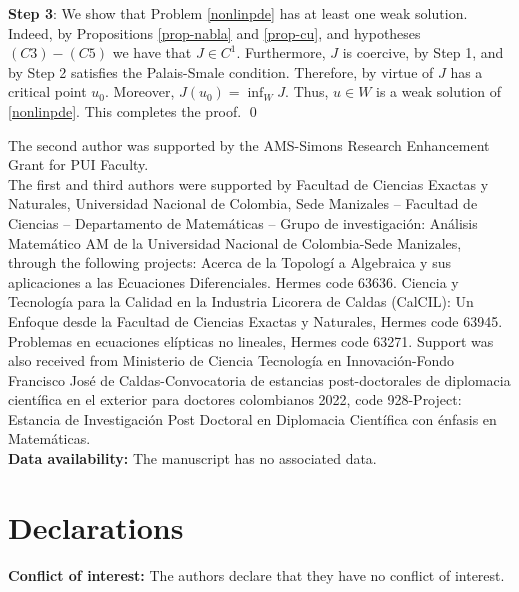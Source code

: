 \documentclass[pdflatex,sn-mathphys-num]{sn-jnl}
\theoremstyle{thmstyleone}%
\theoremstyle{thmstyletwo}%
\theoremstyle{thmstylethree}%
\theoremstyle{thmstylethree}%
\begin{document}
\vskip0.2cm
\noindent
\textbf{Step 3}: We show that Problem \eqref{nonlinpde} has at least one weak solution.
Indeed, by Propositions \ref{prop-nabla} and \ref{prop-cu}, and hypotheses $(C3)-(C5)$ we have that $J\in C^1$. Furthermore, $J$ is coercive, by Step 1, and by Step 2 satisfies the Palais-Smale condition. Therefore, by virtue of \cite[Theorem 2.7]{PR} $J$ has a critical point $u_0$. Moreover, $\displaystyle J(u_0)=\inf_W J$. Thus, $u\in W$  is a weak solution of \eqref{nonlinpde}. This completes the proof. \qed




 The second author  was  supported by the AMS-Simons Research Enhancement Grant for PUI Faculty.\\
 The first and third authors  were  supported by Facultad de Ciencias Exactas y Naturales, Universidad Nacional de Colombia, Sede Manizales – Facultad de Ciencias – Departamento de Matem\'aticas – Grupo de investigaci\'on: An\'alisis Matem\'atico AM de la Universidad Nacional de Colombia-Sede Manizales, through the following projects: Acerca de la Topolog\'i a Algebraica y sus aplicaciones a las Ecuaciones Diferenciales. Hermes code 63636. 
 Ciencia y Tecnolog\'ia para la Calidad en la Industria Licorera de Caldas (CalCIL): Un Enfoque desde la Facultad de Ciencias Exactas y Naturales, Hermes code  63945. Problemas en ecuaciones elípticas no lineales, Hermes code 63271. Support was also 
 received from 
 Ministerio de Ciencia Tecnolog\'ia en Innovaci\'on-Fondo Francisco Jos\'e de Caldas-Convocatoria de estancias post-doctorales de diplomacia cient\'ifica en el exterior para doctores colombianos 2022, code 928-Project: Estancia de Investigaci\'on Post Doctoral en Diplomacia Cient\'ifica con \'enfasis en Matem\'aticas.
\\

\textbf{Data availability:} The manuscript has no associated data.

\section*{Declarations}

\textbf{Conflict of interest:} The authors declare that they have no conflict of interest.
  







\end{document}
